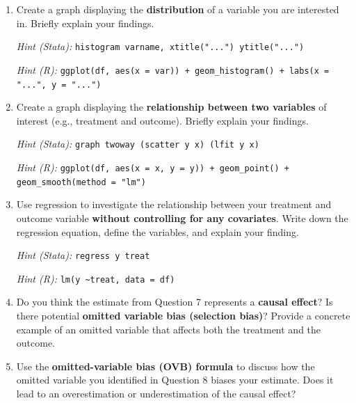 \documentclass[paper=a4, fontsize=11pt]{scrartcl}
\begin{document}
\begin{enumerate}
\vspace{0.3cm}

\item Create a graph displaying the \textbf{distribution} of a variable you are interested in. Briefly explain your findings.

\textit{Hint (Stata):} \texttt{histogram varname, xtitle("...") ytitle("...")}

\textit{Hint (R):} \texttt{ggplot(df, aes(x = var)) + geom\_histogram() + labs(x = "...", y = "...")}

\vspace{0.3cm}

\item Create a graph displaying the \textbf{relationship between two variables} of interest (e.g., treatment and outcome). Briefly explain your findings.

\textit{Hint (Stata):} \texttt{graph twoway (scatter y x) (lfit y x)}

\textit{Hint (R):} \texttt{ggplot(df, aes(x = x, y = y)) + geom\_point() + geom\_smooth(method = "lm")}

\vspace{0.3cm}

\item Use regression to investigate the relationship between your treatment and outcome variable \textbf{without controlling for any covariates}. Write down the regression equation, define the variables, and explain your finding.

\textit{Hint (Stata):} \texttt{regress y treat}

\textit{Hint (R):} \texttt{lm(y \textasciitilde treat, data = df)}

\vspace{0.3cm}

\item Do you think the estimate from Question 7 represents a \textbf{causal effect}? Is there potential \textbf{omitted variable bias (selection bias)}? Provide a concrete example of an omitted variable that affects both the treatment and the outcome.

\vspace{0.3cm}

\item Use the \textbf{omitted-variable bias (OVB) formula} to discuss how the omitted variable you identified in Question 8 biases your estimate. Does it lead to an overestimation or underestimation of the causal effect?


\end{enumerate}
\end{document}
